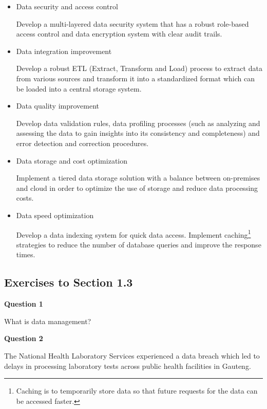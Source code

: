 \documentclass[
]{book}
\begin{document}
\begin{itemize}
\item
  Data security and access control

  Develop a multi-layered data security system that has a robust role-based access control and data encryption system with clear audit trails.
\item
  Data integration improvement

  Develop a robust ETL (Extract, Transform and Load) process to extract data from various sources and transform it into a standardized format which can be loaded into a central storage system.
\item
  Data quality improvement

  Develop data validation rules, data profiling processes (such as analyzing and assessing the data to gain insights into its consistency and completeness) and error detection and correction procedures.
\item
  Data storage and cost optimization

  Implement a tiered data storage solution with a balance between on-premises and cloud in order to optimize the use of storage and reduce data processing costs.
\item
  Data speed optimization

  Develop a data indexing system for quick data access. Implement caching\footnote{Caching is to temporarily store data so that future requests for the data can be accessed faster.} strategies to reduce the number of database queries and improve the response times.
\end{itemize}

\subsection{Exercises to Section 1.3}\label{exercises-to-section-1.3}

\textbf{Question 1}

What is data management?

\textbf{Question 2}

The National Health Laboratory Services experienced a data breach which led to delays in processing laboratory tests across public health facilities in Gauteng.
\end{document}
